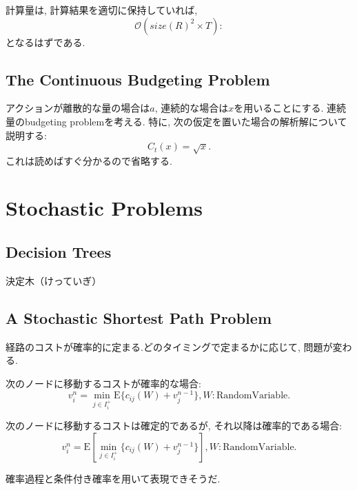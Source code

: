 \documentclass[11pt]{jsbook}
\begin{document}
計算量は, 計算結果を適切に保持していれば,
\[ \mathcal{O} \left( size(R) ^2 \times T\right): \]
となるはずである.

\subsection{The Continuous Budgeting Problem}
アクションが離散的な量の場合は$a$, 連続的な場合は$x$を用いることにする.
連続量のbudgeting problemを考える. 特に, 次の仮定を置いた場合の解析解について説明する:
\begin{equation}
	C_t(x) = \sqrt{x}.
\end{equation}
これは読めばすぐ分かるので省略する.

\section{Stochastic Problems}
\subsection{Decision Trees}
決定木（けっていぎ）

\subsection{A Stochastic Shortest Path Problem}
経路のコストが確率的に定まる.どのタイミングで定まるかに応じて, 問題が変わる.

次のノードに移動するコストが確率的な場合:
\begin{equation}
	v_i^n = \min_{j \in I_i^{+}} \mathrm{E} \{ c_{ij}(W) + v_j^{n-1} \}, W: \mathrm{Random Variable}.
\end{equation}

次のノードに移動するコストは確定的であるが, それ以降は確率的である場合:
\begin{equation}
	v_i^n = \mathrm{E} \left[ \min_{j \in I_i^{+}} \{ c_{ij}(W) + v_j^{n-1} \} \right], W: \mathrm{Random Variable}.
\end{equation}

確率過程と条件付き確率を用いて表現できそうだ.
\end{document}
